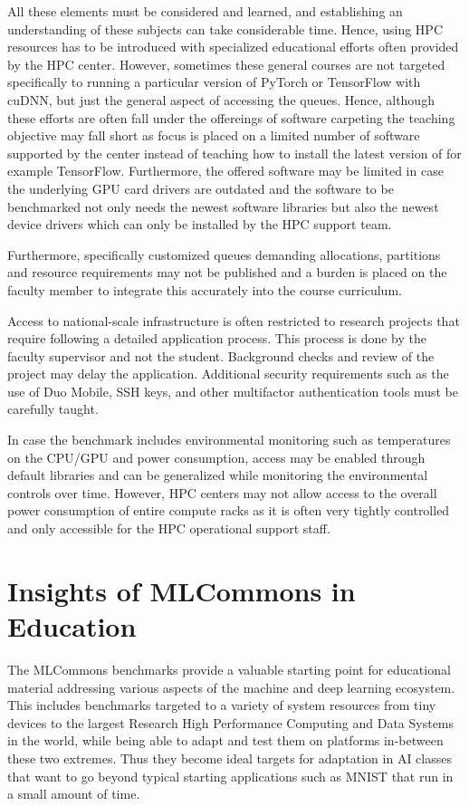 \documentclass[utf8]{FrontiersinVancouver} %
\begin{document}
All these elements must be considered and learned, and establishing an understanding of these subjects can take
considerable time. Hence, using HPC resources has to be introduced
with specialized educational efforts often provided by the HPC
center. However, sometimes these general courses are not targeted
specifically to running a particular version of PyTorch or TensorFlow
with cuDNN, but just the general aspect of accessing the
queues. Hence, although these efforts are often fall under the offereings of software carpeting the teaching objective may fall short as focus is placed on a limited number of software supported by the
center instead of teaching how to install the latest version of for example TensorFlow. Furthermore, the offered software may be limited
in case the underlying GPU card drivers are outdated and the software
to be benchmarked not only needs the newest software libraries but
also the newest device drivers which can only be installed by the HPC
support team.

Furthermore, specifically customized queues demanding allocations,
partitions and resource requirements may not be published and a burden
is placed on the faculty member to integrate this accurately into the
course curriculum.

Access to national-scale infrastructure is often restricted to
research projects that require following a detailed application
process. This process is done by the faculty supervisor and not the
student. Background checks and review of the project may delay the
application. Additional security requirements such as the use of Duo
Mobile, SSH keys, and other multifactor authentication tools must be
carefully taught.

In case the benchmark includes environmental monitoring such as
temperatures on the CPU/GPU and power consumption, access may be
enabled through default libraries and can be generalized while
monitoring the environmental controls over time. However, HPC centers
may not allow access to the overall power consumption of entire
compute racks as it is often very tightly controlled and only
accessible for the HPC operational support staff.

\section{Insights of MLCommons in Education}
\label{sec:edu-mlcommons-insights}

The MLCommons benchmarks provide a valuable starting point for
educational material addressing various aspects of the machine and
deep learning ecosystem. This includes benchmarks targeted to a
variety of system resources from tiny devices to the largest Research
High Performance Computing and Data Systems in the world, while being
able to adapt and test them on platforms in-between these two
extremes. Thus they become ideal targets for adaptation in AI classes
that want to go beyond typical starting applications such as MNIST
that run in a small amount of time.
\end{document}
